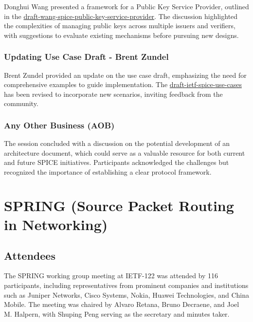\documentclass{article}
\begin{document}
Donghui Wang presented a framework for a Public Key Service Provider, outlined in the \href{https://datatracker.ietf.org/doc/html/draft-wang-spice-public-key-service-provider}{draft-wang-spice-public-key-service-provider}. The discussion highlighted the complexities of managing public keys across multiple issuers and verifiers, with suggestions to evaluate existing mechanisms before pursuing new designs.

\subsubsection{Updating Use Case Draft - Brent Zundel}

Brent Zundel provided an update on the use case draft, emphasizing the need for comprehensive examples to guide implementation. The \href{https://datatracker.ietf.org/doc/draft-ietf-spice-use-cases/}{draft-ietf-spice-use-cases} has been revised to incorporate new scenarios, inviting feedback from the community.

\subsubsection{Any Other Business (AOB)}

The session concluded with a discussion on the potential development of an architecture document, which could serve as a valuable resource for both current and future SPICE initiatives. Participants acknowledged the challenges but recognized the importance of establishing a clear protocol framework.



\newpage

\section{SPRING (Source Packet Routing in Networking)}

\subsection{Attendees}

The SPRING working group meeting at IETF-122 was attended by 116 participants, including representatives from prominent companies and institutions such as Juniper Networks, Cisco Systems, Nokia, Huawei Technologies, and China Mobile. The meeting was chaired by Alvaro Retana, Bruno Decraene, and Joel M. Halpern, with Shuping Peng serving as the secretary and minutes taker.
\end{document}
